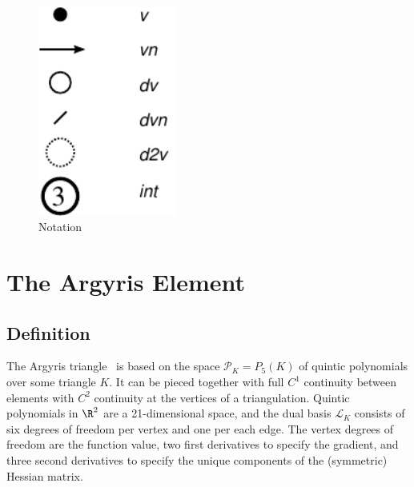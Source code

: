 \begin{figure}[h]
  \hspace{2cm}
  \includegraphics[width=4.5cm]{chapters/kirby-6/pdf/notation.pdf}
  \caption{Notation}
  \label{fig:notation}
\end{figure}

\newpage

\section{The Argyris Element}

\subsection{Definition}

The Argyris triangle~\cite{ArgyrisFriedEtAl1968,Ciarlet2002} is based
on the space \(
\mathcal{P}_K = P_5(K) \) of quintic
polynomials over some triangle \( K \).  It can be pieced together
with full \( C^1 \) continuity between elements with \( C^2 \)
continuity at the vertices of a triangulation. Quintic polynomials in
$\R^2$ are a 21-dimensional space, and the dual basis \( \mathcal{L}_K
\) consists of six degrees of freedom per vertex and one per each edge. The vertex
degrees of freedom are the function value, two first derivatives to specify the
gradient, and three second derivatives to specify the unique
components of the (symmetric) Hessian matrix.

